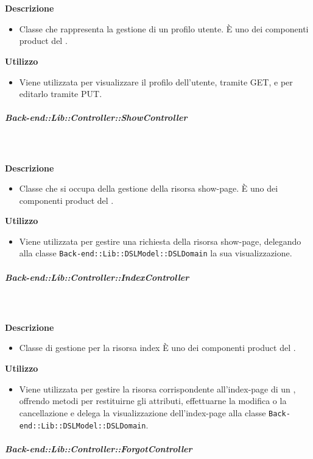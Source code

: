         \textbf{\\ \\ Descrizione} 
          \begin{itemize}
            \item[] Classe che rappresenta la gestione di un profilo utente. È uno dei componenti product del  .
          \end{itemize}      
        \textbf{Utilizzo}  
          \begin{itemize}
            \item[] Viene utilizzata per visualizzare il profilo dell'utente, tramite GET, e per editarlo tramite PUT.
          \end{itemize}
      \subparagraph{Back-end::Lib::Controller::ShowController}
        
        \textbf{\\ \\ Descrizione} 
          \begin{itemize}
            \item[] Classe che si occupa della gestione della risorsa show-page.
È uno dei componenti product del  .
          \end{itemize}      
        \textbf{Utilizzo}  
          \begin{itemize}
            \item[] Viene utilizzata per gestire una richiesta della risorsa show-page, delegando alla classe \texttt{Back-end::Lib::DSLModel::DSLDomain} la sua visualizzazione.
          \end{itemize}
      \subparagraph{Back-end::Lib::Controller::IndexController}
        
        \textbf{\\ \\ Descrizione} 
          \begin{itemize}
            \item[] Classe di gestione per la risorsa index 
È uno dei componenti product del  .

          \end{itemize}      
        \textbf{Utilizzo}  
          \begin{itemize}
            \item[] Viene utilizzata per gestire la risorsa corrispondente all'index-page di un , offrendo metodi per restituirne gli attributi, effettuarne la modifica o la cancellazione e delega la visualizzazione dell'index-page alla classe \texttt{Back-end::Lib::DSLModel::DSLDomain}.

          \end{itemize}
      \subparagraph{Back-end::Lib::Controller::ForgotController}
        
